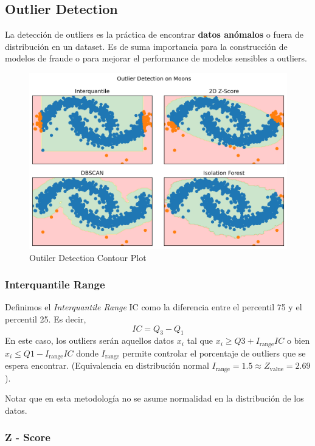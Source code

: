 \subsection{Outlier Detection}

La detección de outliers es la práctica de encontrar \textbf{datos anómalos} o fuera de distribución en un dataset. Es de suma importancia para la construcción de modelos de fraude o para mejorar el performance de modelos sensibles a outliers.

\begin{figure}[H]
    \center
    \includegraphics[scale=0.55]{notebooks/Others/img/outlier_detection.png}
    \caption{Outiler Detection Contour Plot}
\end{figure}

\subsubsection{Interquantile Range}

Definimos el \textit{Interquantile Range} IC como la diferencia entre el percentil 75 y el percentil 25. Es decir, 
$$ 
IC = Q_3 - Q_1
$$
En este caso, los outliers serán aquellos datos $x_i$ tal que 
$x_i \geq Q3 + I_{\text{range}}IC$ o bien $x_i \leq Q1 - I_{\text{range}}IC$
donde $ I_{\text{range}}$ permite controlar el porcentaje de outliers que se espera encontrar. (Equivalencia en distribución normal $I_{\text{range}} = 1.5 \approx Z_{\text{value}} = 2.69$).

Notar que en esta metodología no se asume normalidad en la distribución de los datos. 

\subsubsection{Z - Score}

